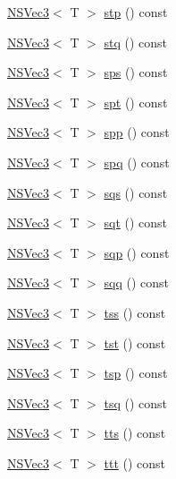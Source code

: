 \begin{DoxyCompactItemize}
\item 
\hyperlink{structNSVec3}{N\-S\-Vec3}$<$ T $>$ \hyperlink{structNSVec4_ac35a8b131e72d61c816c2e539142d5d0}{stp} () const 
\item 
\hyperlink{structNSVec3}{N\-S\-Vec3}$<$ T $>$ \hyperlink{structNSVec4_afa17deb9be96bd78f088d97317b932fd}{stq} () const 
\item 
\hyperlink{structNSVec3}{N\-S\-Vec3}$<$ T $>$ \hyperlink{structNSVec4_a730ba508351a166cd6d95ca12580ba28}{sps} () const 
\item 
\hyperlink{structNSVec3}{N\-S\-Vec3}$<$ T $>$ \hyperlink{structNSVec4_aa49bf5d6231b9e0e17d1fe4b2be0736b}{spt} () const 
\item 
\hyperlink{structNSVec3}{N\-S\-Vec3}$<$ T $>$ \hyperlink{structNSVec4_acaa61464be59be85b3d3982f45aa4163}{spp} () const 
\item 
\hyperlink{structNSVec3}{N\-S\-Vec3}$<$ T $>$ \hyperlink{structNSVec4_a2ec9b5ada3158bd388aeff68c10630c6}{spq} () const 
\item 
\hyperlink{structNSVec3}{N\-S\-Vec3}$<$ T $>$ \hyperlink{structNSVec4_a1de29619d1c99a05f033b00da73af56e}{sqs} () const 
\item 
\hyperlink{structNSVec3}{N\-S\-Vec3}$<$ T $>$ \hyperlink{structNSVec4_adaed488f4c00f0b8d74a818788da4d27}{sqt} () const 
\item 
\hyperlink{structNSVec3}{N\-S\-Vec3}$<$ T $>$ \hyperlink{structNSVec4_a8ded7e56fd91cddd38bc739ec429a31c}{sqp} () const 
\item 
\hyperlink{structNSVec3}{N\-S\-Vec3}$<$ T $>$ \hyperlink{structNSVec4_a247d999c6b6110dc7113317c6f8d26b4}{sqq} () const 
\item 
\hyperlink{structNSVec3}{N\-S\-Vec3}$<$ T $>$ \hyperlink{structNSVec4_ac326bcafed3521d2e73f7defef577eeb}{tss} () const 
\item 
\hyperlink{structNSVec3}{N\-S\-Vec3}$<$ T $>$ \hyperlink{structNSVec4_ac2a2f71a0db8582a24d412f3a068a03c}{tst} () const 
\item 
\hyperlink{structNSVec3}{N\-S\-Vec3}$<$ T $>$ \hyperlink{structNSVec4_aa8f8bde19d9156cb5fd692026f142a2d}{tsp} () const 
\item 
\hyperlink{structNSVec3}{N\-S\-Vec3}$<$ T $>$ \hyperlink{structNSVec4_af5260403b131af23b3c68c7d6ca657cd}{tsq} () const 
\item 
\hyperlink{structNSVec3}{N\-S\-Vec3}$<$ T $>$ \hyperlink{structNSVec4_ad39c38e54d9af8bc311fee119d884e3f}{tts} () const 
\item 
\hyperlink{structNSVec3}{N\-S\-Vec3}$<$ T $>$ \hyperlink{structNSVec4_a2ba024e4befb940430e613f4577da20b}{ttt} () const 

\end{DoxyCompactItemize}
